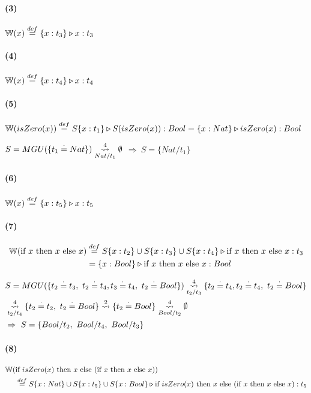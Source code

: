 \documentclass[10pt,a4paper]{article}
\begin{document}
\begin{multicols}{2}
\paragraph{(3)} $\WFunc(x) \equalDef \judgeType{\{x:t_3\}}{x}{t_3}$

\paragraph{(4)} $\WFunc(x) \equalDef \judgeType{\{x:t_4\}}{x}{t_4}$
\end{multicols}


\paragraph{(5)} $\WFunc(isZero(x)) \equalDef \judgeType{S\{x:t_1\}}{S(isZero(x))}{Bool} = \judgeType{\{x:Nat\}}{isZero(x)}{Bool}$ 
\begin{centrado}
$S = MGU(\{t_1 \equalDot Nat\}) \goesTo{4}{Nat/t_1} \emptyset$ $\Rightarrow~S = \{Nat/t_1\}$
\end{centrado}

\paragraph{(6)} $\WFunc(x) \equalDef \judgeType{\{x:t_5\}}{x}{t_5}$

\paragraph{(7)} 
\begin{align*}
\WFunc(\lambdaIf{x}{x}{x}) &\equalDef \judgeType{S\{x:t_2\}\cup S\{x:t_3\}\cup S\{x:t_4\}}{\lambdaIf{x}{x}{x}}{t_3}\\ &= \judgeType{\{x:Bool\}}{\lambdaIf{x}{x}{x}}{Bool}
\end{align*}

\begin{align*}
&S = MGU(\{t_2 \equalDot t_3,~t_2 \equalDot t_4, t_3 \equalDot t_4,~t_2 \equalDot Bool\}) \goesTo{4}{t_2/t_3} \{t_2 \equalDot t_4, t_2 \equalDot t_4,~t_2 \equalDot Bool\} \\ &\goesTo{4}{t_2/t_4} \{t_2 \equalDot t_2,~t_2 \equalDot Bool\} \goesTo{2}{} \{t_2 \equalDot Bool\} \goesTo{4}{Bool/t_2} \emptyset \\
&\Rightarrow~S = \{Bool/t_2,~Bool/t_4,~Bool/t_3\}
\end{align*}


\paragraph{(8)}
\begin{align*}
\WFunc(&\lambdaIf{isZero(x)}{x}{(\lambdaIf{x}{x}{x}})) \\
&\equalDef \judgeType{S\{x:Nat\}\cup S\{x:t_5\}\cup S\{x:Bool\}}{\lambdaIf{isZero(x)}{x}{(\lambdaIf{x}{x}{x}})}{t_5}\\ 
\end{align*}
\end{document}

